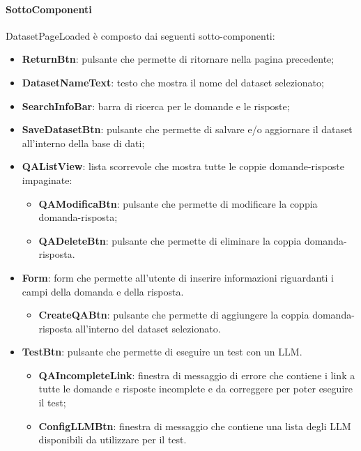 \paragraph{SottoComponenti}
DatasetPageLoaded è composto dai seguenti sotto-componenti:
\begin{itemize}
        \item \textbf{ReturnBtn}: pulsante che permette di ritornare nella pagina precedente;
        \item \textbf{DatasetNameText}: testo che mostra il nome del dataset selezionato;
        \item \textbf{SearchInfoBar}: barra di ricerca per le domande e le risposte;
        \item \textbf{SaveDatasetBtn}: pulsante che permette di salvare e/o aggiornare il dataset all'interno della base di dati;
        \item \textbf{QAListView}: lista scorrevole che mostra tutte le coppie domande-risposte impaginate:
        \begin{itemize}
            \item \textbf{QAModificaBtn}: pulsante che permette di modificare la coppia domanda-risposta;
            \item \textbf{QADeleteBtn}: pulsante che permette di eliminare la coppia domanda-risposta.
        \end{itemize}

        \item \textbf{Form}: form che permette all'utente di inserire informazioni riguardanti i campi della domanda e della risposta. 
        \begin{itemize}
            \item \textbf{CreateQABtn}: pulsante che permette di aggiungere la coppia domanda-risposta all'interno del dataset selezionato.
        \end{itemize}

        \item \textbf{TestBtn}: pulsante che permette di eseguire un test con un LLM. 
        \begin{itemize}
            \item \textbf{QAIncompleteLink}: finestra di messaggio di errore che contiene i link a tutte le domande e risposte incomplete e da correggere per poter eseguire il test;
            \item \textbf{ConfigLLMBtn}: finestra di messaggio che contiene una lista degli LLM disponibili da utilizzare per il test.
        \end{itemize}

    \end{itemize}

